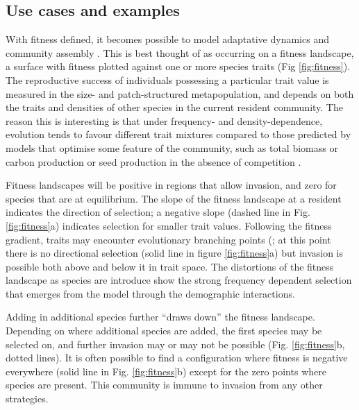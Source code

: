 \documentclass[]{article}
\begin{document}
\subsection{Use cases and examples}\label{use-cases-and-examples-3}

With fitness defined, it becomes possible to model adaptative dynamics
and community assembly \citep{Dieckmann-2007, Geritz-1998}. This is best
thought of as occurring on a fitness landscape, a surface with fitness
plotted against one or more species traits (Fig \ref{fig:fitness}). The
reproductive success of individuals possessing a particular trait value
is measured in the size- and patch-structured metapopulation, and
depends on both the traits and densities of other species in the current
resident community. The reason this is interesting is that under
frequency- and density-dependence, evolution tends to favour different
trait mixtures compared to those predicted by models that optimise some
feature of the community, such as total biomass or carbon production or
seed production in the absence of competition
\citep{Falster-2003, Dieckmann-2007}.


Fitness landscapes will be positive in regions that allow invasion, and
zero for species that are at equilibrium. The slope of the fitness
landscape at a resident indicates the direction of selection; a negative
slope (dashed line in Fig. \ref{fig:fitness}a) indicates selection for
smaller trait values. Following the fitness gradient, traits may
encounter evolutionary branching points (; at this point there is no directional selection (solid line in
figure \ref{fig:fitness}a) but invasion is possible both above and below
it in trait space. The distortions of the fitness landscape as species
are introduce show the strong frequency dependent selection that emerges
from the model through the demographic interactions.


Adding in additional species further ``draws down'' the fitness
landscape. Depending on where additional species are added, the first
species may be selected on, and further invasion may or may not be
possible (Fig. \ref{fig:fitness}b, dotted lines). It is often possible
to find a configuration where fitness is negative everywhere (solid line
in Fig. \ref{fig:fitness}b) except for the zero points where species are
present. This community is immune to invasion from any other strategies.
\end{document}
